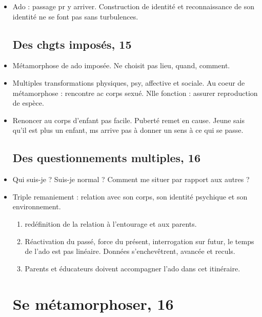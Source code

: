 \documentclass[12pt]{report}
\begin{document}
\begin{itemize}
\item Ado : passage pr y arriver. Construction de identité et reconnaissance de son identité ne se font pas sans turbulences. \\

\subsection{Des chgts imposés, 15}

\item Métamorphose de ado imposée. Ne choisit pas lieu, quand, comment.\\
\item Multiples transformations physiques, psy, affective et sociale. Au coeur de métamorphose : rencontre ac corps sexué. Nlle fonction : assurer reproduction de espèce.\\
\item Renoncer au corps d'enfant pas facile. Puberté remet en cause. Jeune sais qu'il est plus un enfant, ms arrive pas à donner un sens à ce qui se passe. \\

\subsection{Des questionnements multiples, 16}

\item Qui suis-je ? Suis-je normal ? Comment me situer par rapport aux autres ?\\
\item Triple remaniement : relation avec son corps, son identité psychique et son environnement.
\begin{enumerate}
\item redéfinition de la relation à l'entourage et aux parents. \\
\item Réactivation du passé, force du présent, interrogation sur futur, le temps de l'ado est pas linéaire. Données s'enchevêtrent, avancée et reculs. \\
\item Parents et éducateurs doivent accompagner l'ado dans cet itinéraire.\\
\end{enumerate}

\section{Se métamorphoser, 16}


\end{itemize}
\end{document}
